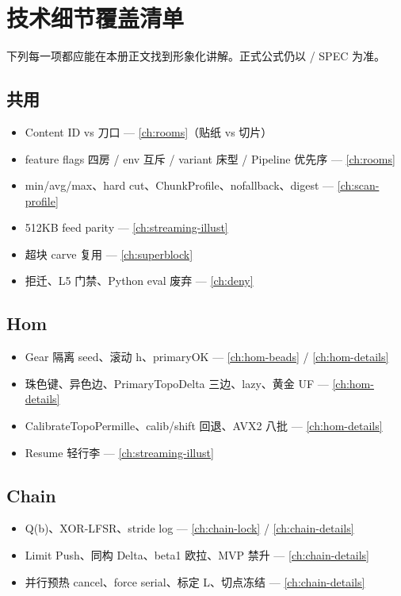\chapter{技术细节覆盖清单}
\label{ch:coverage}

下列每一项都应能在本册正文找到形象化讲解。正式公式仍以  / SPEC 为准。

\section{共用}

\begin{itemize}[nosep]
  \item Content ID vs 刀口 — \cref{ch:rooms}（贴纸 vs 切片）
  \item feature flags 四房 / env 互斥 / variant 床型 / Pipeline 优先序 — \cref{ch:rooms}
  \item min/avg/max、hard cut、ChunkProfile、nofallback、digest — \cref{ch:scan-profile}
  \item 512KB feed parity — \cref{ch:streaming-illust}
  \item 超块 carve 复用 — \cref{ch:superblock}
  \item 拒迁、L5 门禁、Python eval 废弃 — \cref{ch:deny}
\end{itemize}

\section{Hom}

\begin{itemize}[nosep]
  \item Gear 隔离 seed、滚动 h、primaryOK — \cref{ch:hom-beads} / \cref{ch:hom-details}
  \item 珠色键、异色边、PrimaryTopoDelta 三边、lazy、黄金 UF — \cref{ch:hom-details}
  \item CalibrateTopoPermille、calib/shift 回退、AVX2 八批 — \cref{ch:hom-details}
  \item Resume 轻行李 — \cref{ch:streaming-illust}
\end{itemize}

\section{Chain}

\begin{itemize}[nosep]
  \item Q(b)、XOR-LFSR、stride log — \cref{ch:chain-lock} / \cref{ch:chain-details}
  \item Limit Push、同构 Delta、beta1 欧拉、MVP 禁升 — \cref{ch:chain-details}
  \item 并行预热 cancel、force serial、标定 L、切点冻结 — \cref{ch:chain-details}
\end{itemize}

